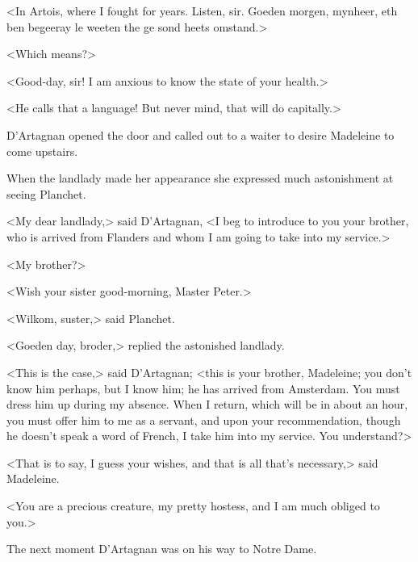 <In Artois, where I fought for years. Listen, sir. Goeden morgen, mynheer, eth ben begeeray le weeten the ge sond heets omstand.>

<Which means?>

<Good-day, sir! I am anxious to know the state of your health.>

<He calls that a language! But never mind, that will do capitally.>

D'Artagnan opened the door and called out to a waiter to desire Madeleine to come upstairs.

When the landlady made her appearance she expressed much astonishment at seeing Planchet.

<My dear landlady,> said D'Artagnan, <I beg to introduce to you your brother, who is arrived from Flanders and whom I am going to take into my service.>

<My brother?>

<Wish your sister good-morning, Master Peter.>

<Wilkom, suster,> said Planchet.

<Goeden day, broder,> replied the astonished landlady.

<This is the case,> said D'Artagnan; <this is your brother, Madeleine; you don't know him perhaps, but I know him; he has arrived from Amsterdam. You must dress him up during my absence. When I return, which will be in about an hour, you must offer him to me as a servant, and upon your recommendation, though he doesn't speak a word of French, I take him into my service. You understand?>

<That is to say, I guess your wishes, and that is all that's necessary,> said Madeleine.

<You are a precious creature, my pretty hostess, and I am much obliged to you.>

The next moment D'Artagnan was on his way to Notre Dame.